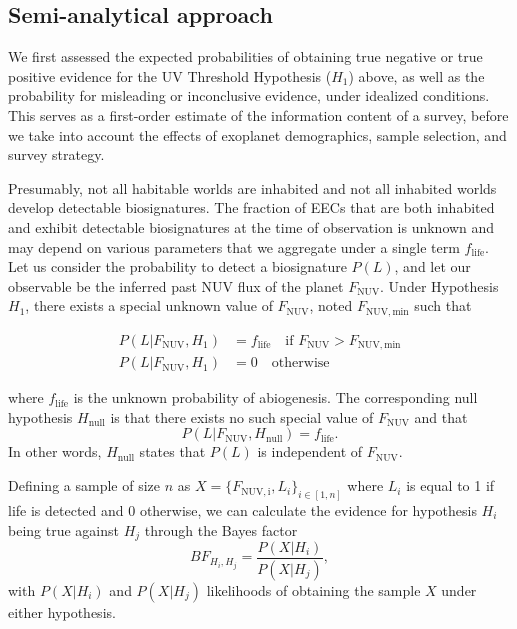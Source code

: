 \documentclass[twocolumn,twocolappendix,linenumbers]{aastex631}
\begin{document}
\subsection{Semi-analytical approach}\label{sec:met-semianalytical}
We first assessed the expected probabilities of obtaining true negative or true positive evidence for the UV Threshold Hypothesis ($H_1$) above, as well as the probability for misleading or inconclusive evidence, under idealized conditions.
This serves as a first-order estimate of the information content of a survey, before we take into account the effects of exoplanet demographics, sample selection, and survey strategy.

Presumably, not all habitable worlds are inhabited and not all inhabited worlds develop detectable biosignatures.
The fraction of \glspl{EEC} that are both inhabited and exhibit detectable biosignatures at the time of observation is unknown and may depend on various parameters that we aggregate under a single term $f_\mathrm{life}$.
Let us consider the probability to detect a biosignature $P(L)$, and let our observable be the inferred past \gls{NUV} flux of the planet $F_\mathrm{NUV}$.
Under Hypothesis $H_1$, there exists a special unknown value of $F_\mathrm{NUV}$, noted $F_\mathrm{NUV, min}$ such that

\begin{align}
    P(L|F_\mathrm{NUV},H_1) &=  f_\mathrm{life} \quad \text{if } F_\mathrm{NUV}>F_\mathrm{NUV, min}\\
    P(L|F_\mathrm{NUV},H_1) &=  0               \quad  \text{otherwise}
\end{align}

where $f_\mathrm{life}$ is the unknown probability of abiogenesis.
The corresponding null hypothesis $H_\mathrm{null}$ is that there exists no such special value of $F_\mathrm{NUV}$ and that
\begin{equation}
P(L|F_\mathrm{NUV},H_\mathrm{null}) = f_\mathrm{life}.
\end{equation}
In other words, $H_\mathrm{null}$ states that $P(L)$ is independent of $F_\mathrm{NUV}$.

Defining a sample of size $n$ as $X=\{F_\mathrm{NUV, i},L_i\}_{i \in [1,n]}$ where $L_i$ is equal to 1 if life is detected and 0 otherwise, we can calculate the evidence for hypothesis $H_i$ being true against $H_j$ through the Bayes factor
\begin{equation}
BF_{H_i,H_j} = \frac{P(X|H_i)}{P(X|H_j)},
\end{equation}
with $P(X|H_i)$ and $P(X|H_j)$ likelihoods of obtaining the sample $X$ under either hypothesis.
\end{document}
